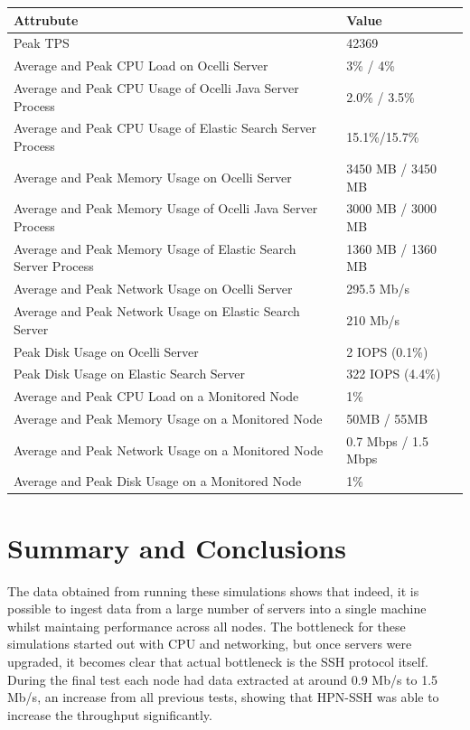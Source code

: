 \documentclass{llncs}
\begin{document}
\begin{flushleft}
    \begin{tabular}{ | l | l |}
    \hline
  Attrubute & Value  \\ \hline
  Peak TPS & 42369  \\ \hline
  Average and Peak CPU Load on Ocelli Server &3\% / 4\%  \\ \hline
  Average and Peak CPU Usage of Ocelli Java Server Process & 2.0\% / 3.5\% \\ \hline
 Average and Peak CPU Usage of Elastic Search Server Process & 15.1\%/15.7\%	  \\ \hline
  Average and Peak Memory Usage on Ocelli Server & 3450 MB / 3450 MB	 \\ \hline
  Average and Peak Memory Usage of Ocelli Java Server Process &	3000 MB / 3000 MB		 \\ \hline
 Average and Peak Memory Usage of Elastic Search Server Process &	1360 MB / 1360 MB		 \\ \hline
Average and Peak Network Usage on Ocelli Server &	295.5 Mb/s 	 \\ \hline
Average and Peak Network Usage on Elastic Search Server & 210 Mb/s 	 \\ \hline
Peak Disk Usage on Ocelli Server &	2 IOPS (0.1\%)		 \\ \hline
Peak Disk Usage on Elastic Search Server &	322 IOPS (4.4\%)		 \\ \hline
Average and Peak CPU Load on a Monitored Node& 	1\% 	 \\ \hline
  Average and Peak Memory Usage on a Monitored Node &	50MB / 55MB	 \\ \hline
Average and Peak Network Usage on a Monitored Node &	0.7 Mbps / 1.5 Mbps		 \\ \hline
  Average and Peak Disk Usage on a Monitored Node &  1\%	\\ 
    \hline
    \end{tabular}
\end{flushleft}

\section{Summary and Conclusions}

The data obtained from running these simulations shows that indeed, it is possible to ingest data from a large number of servers into a single machine whilst maintaing performance across all nodes. The bottleneck for these simulations started out with CPU and networking, but once servers were upgraded, it becomes clear that actual bottleneck is the SSH protocol itself. During the final test each node had data extracted at around 0.9 Mb/s to 1.5 Mb/s, an increase from all previous tests, showing that HPN-SSH was able to increase the throughput significantly. 
\end{document}
